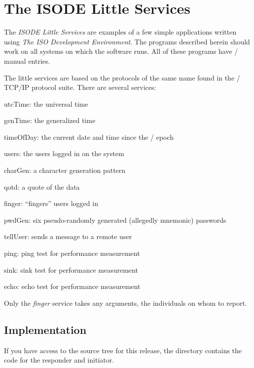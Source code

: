 
\chapter	{The ISODE Little Services}\label{imisc}
The {\em ISODE Little Services\/} are examples of a few simple
applications written using {\em The ISO Development Environment}.
The programs described herein should work on all systems on which the
software runs.
All of these programs have \unix/ manual entries.

The little services are based on the protocols of the same name found in
the \dod/ TCP/IP protocol suite.
There are several services:
\begin{describe}
\item[utcTime:] the universal time

\item[genTime:] the generalized time

\item[timeOfDay:]	the current date and time since the \unix/ epoch

\item[users:]	the users logged in on the system

\item[charGen:]	a character generation pattern

\item[qotd:]	a quote of the data

\item[finger:]	``fingers'' users logged in

\item[pwdGen:]	six pseudo-randomly generated (allegedly mnemonic) passwords

\item[tellUser:] sends a message to a remote user

\item[ping:] ping test for performance measurement

\item[sink:] sink test for performance measurement

\item[echo:] echo test for performance measurement
\end{describe}
Only the {\em finger\/} service takes any arguments,
the individuals on whom to report.

\section	{Implementation}
If you have access to the source tree for this release,
the directory  contains the code for the responder and initiator.


